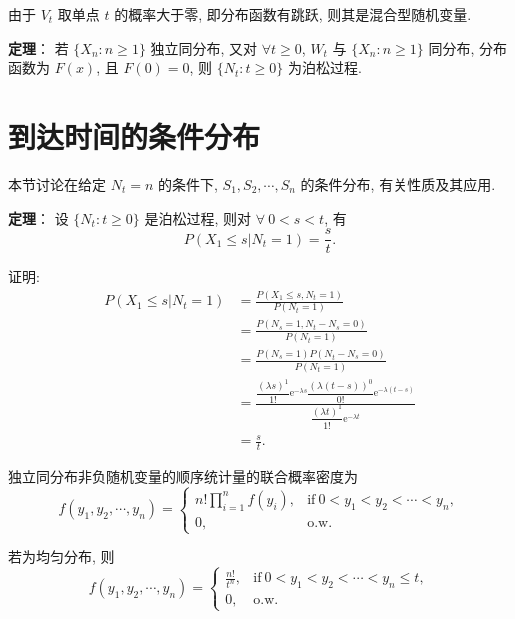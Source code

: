 \documentclass[openany]{ctexbook}
\theoremstyle{kaiti}
\theoremstyle{normal}
\begin{document}
  由于 $V_t$ 取单点 $t$ 的概率大于零, 即分布函数有跳跃, 则其是混合型随机变量.
  
\textbf{定理}：  
  若 $\{X_n:n\geqslant1\}$ 独立同分布, 又对 $\forall t\geqslant0$, $W_t$ 与 $\{X_n:n\geqslant1\}$ 同分布, 分布函数为 $F(x)$, 且 $F(0)=0$, 则 $\{N_t:t\geqslant0\}$ 为泊松过程.
  
\section{到达时间的条件分布}
  
  本节讨论在给定 $N_t=n$ 的条件下, $S_1,S_2,\cdots,S_n$ 的条件分布, 有关性质及其应用.
  
\textbf{定理}：  
  设 $\{N_t:t\geqslant0\}$ 是泊松过程, 则对 $\forall~0 < s < t$, 有
\begin{equation}
    P(X_1\leqslant s|N_t=1)=\frac{s}{t}.
\end{equation}
  
  证明: 
\begin{equation}
    \begin{aligned}
      P(X_1\leqslant s|N_t=1)
      &=\frac{P(X_1\leqslant s,N_t=1)}{P(N_t=1)}\\
      &=\frac{P(N_s=1,N_t-N_s=0)}{P(N_t=1)}\\
      &=\frac{P(N_s=1)P(N_t-N_s=0)}{P(N_t=1)}\\
      &=\frac{\dfrac{(\lambda s)^1}{1!}\mathrm{e}^{-\lambda s}\dfrac{(\lambda (t-s))^0}{0!}\mathrm{e}^{-\lambda (t-s)}}{\dfrac{(\lambda t)^1}{1!}\mathrm{e}^{-\lambda t}}\\
      &=\frac{s}{t}.
    \end{aligned}
\end{equation}
  
  独立同分布非负随机变量的顺序统计量的联合概率密度为
\begin{equation}
    f(y_1,y_2,\cdots,y_n)=
    \begin{cases}
      \displaystyle n!\prod_{i=1}^n f(y_i), &\text{if}~0 < y_1 < y_2 < \cdots < y_n,\\
      0, &\text{o.w.}
    \end{cases}
\end{equation}
  
  若为均匀分布, 则
\begin{equation}
    f(y_1,y_2,\cdots,y_n)=
    \begin{cases}
      \displaystyle \frac{n!}{t^n}, &\text{if}~0 < y_1 < y_2 < \cdots < y_n \leqslant t,\\
      0, &\text{o.w.}
    \end{cases}
\end{equation}
  
\end{document}
